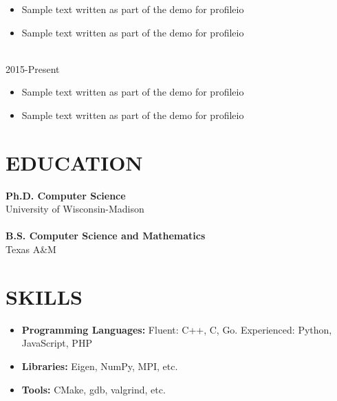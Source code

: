 \documentclass{res}
\begin{document}
\begin{resume}
\begin{itemize}[leftmargin=\parindent]
	\item Sample text written as part of the demo for profileio
	\item Sample text written as part of the demo for profileio
	\end{itemize}
	
	\hspace*{-0.25in}{\bf Project V} \\
	\hspace*{-0.25in} \hfill 2015-Present
	\begin{itemize}[leftmargin=\parindent]
	\setlength{\itemsep}{0mm} \smallskip
	
	\item Sample text written as part of the demo for profileio
	\item Sample text written as part of the demo for profileio
	\end{itemize}
	
	
	
	\section{\MakeUppercase{Education}} \vskip 0.15in
	
	{\bf Ph.D. Computer Science} \hfill  \\
	{University of Wisconsin-Madison \hfill } \\ \\
	{\bf B.S. Computer Science and Mathematics} \hfill  \\
	{Texas A\&M \hfill } 
	
	
	
	\section{\MakeUppercase{Skills}} \vskip 0.35in
	\begin{itemize}[leftmargin=\parindent]
	\setlength{\itemsep}{6pt}
	
		\item[] {\bf Programming Languages:} Fluent: C++, C, Go. Experienced: Python, JavaScript, PHP
		\item[] {\bf Libraries:} Eigen, NumPy, MPI, etc.
		\item[] {\bf Tools:} CMake, gdb, valgrind, etc.
	\end{itemize}
	

\end{resume}
\end{document}

